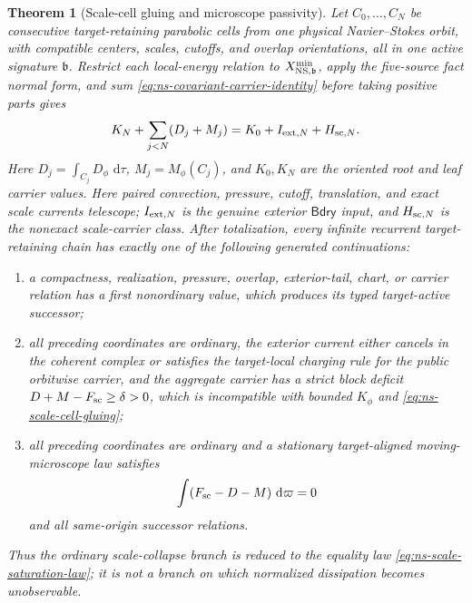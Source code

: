 \documentclass[11pt]{article}
\numberwithin{section}{part}
\theoremstyle{plain}
\newtheorem{theorem}{Theorem}[section]
\theoremstyle{definition}
\theoremstyle{remark}
\newcommand{\dd}{\,\mathrm d}
\newcommand{\Bdry}{\mathsf{Bdry}}
\begin{document}
\begin{theorem}[Scale-cell gluing and microscope passivity]
\label{thm:ns-microscope-passivity}
Let \(C_0,\ldots,C_N\) be consecutive target-retaining parabolic cells from
one physical Navier--Stokes orbit, with compatible centers, scales, cutoffs,
and overlap orientations, all in one active signature \(\mathfrak b\).
Restrict each local-energy relation to
\(X^{\min}_{{\rm NS},\mathfrak b}\), apply the
five-source fact normal form, and sum
\eqref{eq:ns-covariant-carrier-identity} before taking positive parts gives
\begin{equation}
 \label{eq:ns-scale-cell-gluing}
 K_N+\sum_{j<N}(D_j+M_j)
 =K_0+I_{{\rm ext},N}+H_{{\rm sc},N}.
\end{equation}
Here \(D_j=\int_{C_j}D_\phi\,\dd\tau\),
\(M_j=M_\phi(C_j)\), and \(K_0,K_N\) are the oriented root and leaf
carrier values.
Here paired convection, pressure, cutoff, translation, and exact scale
currents telescope; \(I_{{\rm ext},N}\) is the genuine exterior
\(\Bdry\) input, and \(H_{{\rm sc},N}\) is the nonexact scale-carrier class.
After totalization, every infinite recurrent target-retaining chain has
exactly one of the following generated continuations:
\begin{enumerate}[label=\textup{(\roman*)}]
\item a compactness, realization, pressure, overlap, exterior-tail, chart, or
carrier relation has a first nonordinary value, which produces its typed
target-active successor;
\item all preceding coordinates are ordinary, the exterior current either
cancels in the coherent complex or satisfies the target-local charging rule
for the public orbitwise carrier, and the
aggregate carrier has a strict block deficit
\(D+M-F_{\rm sc}\ge\delta>0\), which is incompatible with bounded
\(K_\phi\) and \eqref{eq:ns-scale-cell-gluing};
\item all preceding coordinates are ordinary and a stationary target-aligned
moving-microscope law satisfies
\begin{equation}
 \label{eq:ns-scale-saturation-law}
 \int(F_{\rm sc}-D-M)\,\dd\varpi=0
\end{equation}
and all same-origin successor relations.
\end{enumerate}
Thus the ordinary scale-collapse branch is reduced to the equality law
\eqref{eq:ns-scale-saturation-law}; it is not a branch on which normalized
dissipation becomes unobservable.
\end{theorem}
\end{document}
